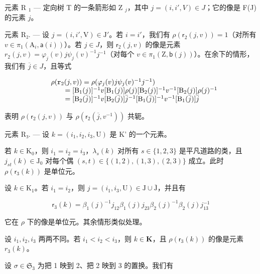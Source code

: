 元素 R \(_{1}\) --- 定向树 T 的一条箭形如 Z \(_{j}\)，其中 \(j = (i, i', V) \in J\)；它的像是 F(J) 的元素 \(j\)。

元素 R₂. --- 设 \(j = (i, i', \mathrm{V}) \in \mathrm{J}'\)。若 \(i = i'\)，我们有 \(\rho(\mathsf{r}_2(j, v)) = 1\)（对所有 \(v \in \pi_1(\mathrm{A}_i, \mathsf{a}(i))\)）。若 \(j \in J\)，则 \(\mathsf{r}_2(j, v)\) 的像是元素 \(r_2(j, v) = \varphi_j(v) j \psi_j(v)^{-1} j^{-1}\)（对每个 \(v \in \pi_1(\mathrm{Z}, \mathsf{b}(j))\)）。在余下的情形，我们有 \(\overline{j} \in J\)，且等式

\[
\begin{array}{r l} & {\rho (\mathtt {r} _ {2} (j, v)) = \rho (\varphi_ {j} (v) j \psi_ {j} (v) ^ {- 1} j ^ {- 1})} \\ & {\qquad = [ \mathrm{B} _ {1} (j) ] ^ {- 1} v [ \mathrm{B} _ {1} (j) ] \rho (j) [ \mathrm{B} _ {2} (j) ] ^ {- 1} v ^ {- 1} [ \mathrm{B} _ {2} (j) ] \rho (j) ^ {- 1}} \\ & {\qquad = [ \mathrm{B} _ {2} (\bar {j}) ] ^ {- 1} v [ \mathrm{B} _ {2} (\bar {j}) ] \bar {j} ^ {- 1} [ \mathrm{B} _ {1} (\bar {j}) ] ^ {- 1} v ^ {- 1} [ \mathrm{B} _ {1} (\bar {j}) ] \bar {j}} \end{array}
\]

表明 \(\rho(\mathsf{r}_2(j,v))\) 与 \(\rho(\mathsf{r}_2(\overline{j},v^{-1}))\) 共轭。

元素 R₃. — 设 \(k = (i_{1}, i_{2}, i_{3}, \mathrm{U})\) 是 K' 的一个元素。

若 \(k \in \mathrm{K}_0\)，则 \(i_1 = i_2 = i_3\)，\(\lambda_s(k)\) 对所有 \(s \in \{1,2,3\}\) 是平凡道路的类，且 \(j_{st}(k) \in \mathrm{J}_0\) 对每个偶 \((s,t) \in \{(1,2),(1,3),(2,3)\}\) 成立。此时 \(\rho(\mathsf{r}_3(k))\) 是单位元。

设 \(k\in \mathrm{K}_1\)。若 \(i_1 = i_2\)，则 \(j = (i_{1},i_{3},\mathrm{U})\in \mathrm{J}\cup \overline{\mathrm{J}}\)，并且有

\[
\mathsf {r} _ {3} (k) = \beta_ {1} (j) ^ {- 1} j _ {1 2} \beta_ {1} (j) j _ {2 3} \beta_ {2} (j) ^ {- 1} \beta_ {2} (j) j _ {1 3} ^ {- 1}
\]

它在 \(\rho\) 下的像是单位元。其余情形类似处理。

设 \(i_{1}, i_{2}, i_{3}\) 两两不同。若 \(i_{1} < i_{2} < i_{3}\)，则 \(k \in \mathbf{K}\)，且 \(\rho(\mathsf{r}_{3}(k))\) 的像是元素 \(r_{3}(k)\)。

设 \(\sigma \in \mathfrak{S}_3\) 为把 1 映到 2、把 2 映到 3 的置换。我们有

